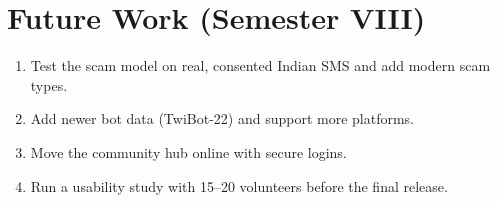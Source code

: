 \section{Future Work (Semester VIII)}
\begin{enumerate}
\item Test the scam model on real, consented Indian SMS and add modern scam types.
\item Add newer bot data (TwiBot-22) and support more platforms.
\item Move the community hub online with secure logins.
\item Run a usability study with 15--20 volunteers before the final release.
\end{enumerate}

